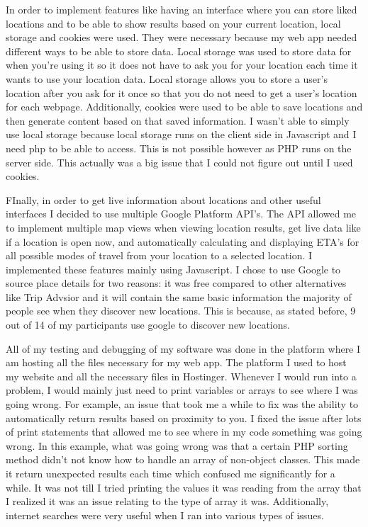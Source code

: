 \documentclass[12pt,twocolumn]{article}
\begin{document}
In order to implement features like having an interface where you can store liked locations and to be able to show results based on your current location, local storage and cookies were used. They were necessary because my web app needed different ways to be able to store data. Local storage was used to store data for when you’re using it so it does not have to ask you for your location each time it wants to use your location data. Local storage allows you to store a user’s location after you ask for it once so that you do not need to get a user's location for each webpage. Additionally, cookies were used to be able to save locations and then generate content based on that saved information. I wasn't able to simply use local storage because local storage runs on the client side in Javascript and I need php to be able to access. This is not possible however as PHP runs on the server side. This actually was a big issue  that I could not figure out until I used cookies. 

FInally, in order to get live information about locations and other useful interfaces I decided to use multiple Google Platform API’s. The API allowed me to implement multiple map views when viewing location results, get live data like if a location is open now, and automatically calculating and displaying ETA’s for all possible modes of travel from your location to a selected location. I implemented these features mainly using Javascript. I chose to use Google to source place details for two reasons: it was free compared to other alternatives like Trip Advsior and it will contain the same basic information  the majority of people see when they discover new locations. This is because, as stated before, 9 out of 14 of my participants use google to discover new locations. 

All of my testing and debugging of my software was done in the platform where I am hosting all the files necessary for my web app. The platform I used to host my website and all the necessary files in Hostinger. Whenever I would run into a problem, I would mainly just need to print variables or arrays to see where I was going wrong. For example, an issue that took me a while to fix was the ability to automatically return results based on proximity to you. I fixed the issue after lots of print statements that allowed me to see where in my code something was going wrong. In this example, what was going wrong was that a certain PHP sorting method didn't not know how to handle an array of non-object classes. This made it return unexpected results each time which confused me significantly for a while. It was not till I tried printing the values it was reading from the array that I realized it was an issue relating to the type of array it was. Additionally, internet searches were very useful when I ran into various types of issues.
\end{document}
